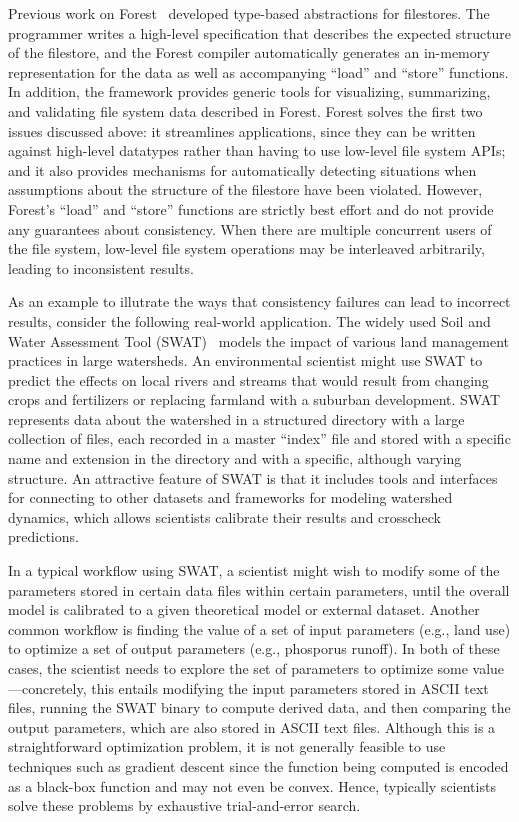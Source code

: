 %
%
Previous work on Forest~\cite{forest-icfp:fisher+} developed
type-based abstractions for filestores. The programmer writes a
high-level specification that describes the expected structure of the
filestore, and the Forest compiler automatically generates an
in-memory representation for the data as well as accompanying ``load''
and ``store'' functions. In addition, the framework provides generic
tools for visualizing, summarizing, and validating file system data
described in Forest. Forest solves the first two issues discussed
above: it streamlines applications, since they can be written against
high-level datatypes rather than having to use low-level file system
APIs; and it also provides mechanisms for automatically detecting
situations when assumptions about the structure of the filestore
have been violated. However, Forest's ``load'' and ``store'' functions
are strictly best effort and do not provide any guarantees about
consistency. When there are multiple concurrent users of the file
system, low-level file system operations may be interleaved
arbitrarily, leading to inconsistent results.

%
%
As an example to illutrate the ways that consistency failures can lead
to incorrect results, consider the following real-world
application. The widely used Soil and Water Assessment Tool (SWAT)~\cite{SWAT} 
models the impact of various land management practices in
large watersheds. An environmental scientist might use SWAT to predict
the effects on local rivers and streams that would result from
changing crops and fertilizers or
replacing farmland with a suburban development. SWAT represents
data about the watershed in a structured directory with a large
collection of files, each recorded in a master ``index'' file and
stored with a specific name and extension in the directory and with a
specific, although varying structure. An attractive feature of SWAT is
that it includes tools and interfaces for connecting to other datasets
and frameworks for modeling watershed dynamics, which allows
scientists calibrate their results and crosscheck predictions.

%
%
In a typical workflow using SWAT, a scientist might wish to modify
some of the parameters stored in certain data files within certain
parameters, until the overall model is calibrated to a given
theoretical model or external dataset. Another common workflow is
finding the value of a set of input parameters (e.g., land use) to
optimize a set of output parameters (e.g., phosporus runoff). In both
of these cases, the scientist needs to explore the set of parameters
to optimize some value---concretely, this entails modifying the input
parameters stored in ASCII text files, running the SWAT binary to
compute derived data, and then comparing the output parameters, which
are also stored in ASCII text files. Although this is a
straightforward optimization problem, it is not generally feasible to
use techniques such as gradient descent since the function being
computed is encoded as a black-box function and may not even be
convex. Hence, typically scientists solve these problems by exhaustive
trial-and-error search.

